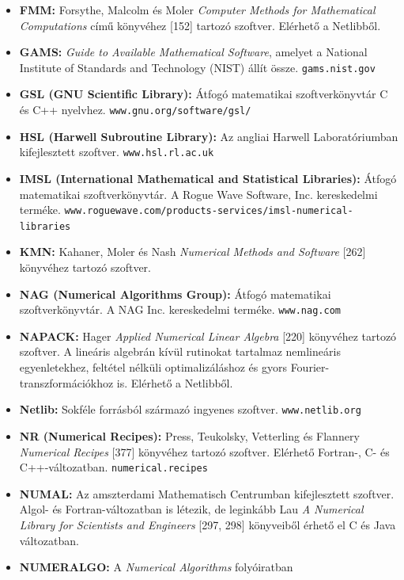 \documentclass[
  magyar,
  11pt]{article}
\providecommand{\tightlist}{%
  \setlength{\itemsep}{0pt}\setlength{\parskip}{0pt}}
\begin{document}
\begin{itemize}
\tightlist
\item
  \textbf{FMM:} Forsythe, Malcolm és Moler \emph{Computer Methods for
  Mathematical Computations} című könyvéhez {[}152{]} tartozó szoftver.
  Elérhető a Netlibből.
\item
  \textbf{GAMS:} \emph{Guide to Available Mathematical Software},
  amelyet a National Institute of Standards and Technology (NIST) állít
  össze. \texttt{gams.nist.gov}
\item
  \textbf{GSL (GNU Scientific Library):} Átfogó matematikai
  szoftverkönyvtár C és C++ nyelvhez. \texttt{www.gnu.org/software/gsl/}
\item
  \textbf{HSL (Harwell Subroutine Library):} Az angliai Harwell
  Laboratóriumban kifejlesztett szoftver. \texttt{www.hsl.rl.ac.uk}
\item
  \textbf{IMSL (International Mathematical and Statistical Libraries):}
  Átfogó matematikai szoftverkönyvtár. A Rogue Wave Software, Inc.
  kereskedelmi terméke.
  \texttt{www.roguewave.com/products-services/imsl-numerical-libraries}
\item
  \textbf{KMN:} Kahaner, Moler és Nash \emph{Numerical Methods and
  Software} {[}262{]} könyvéhez tartozó szoftver.
\item
  \textbf{NAG (Numerical Algorithms Group):} Átfogó matematikai
  szoftverkönyvtár. A NAG Inc. kereskedelmi terméke.
  \texttt{www.nag.com}
\item
  \textbf{NAPACK:} Hager \emph{Applied Numerical Linear Algebra}
  {[}220{]} könyvéhez tartozó szoftver. A lineáris algebrán kívül
  rutinokat tartalmaz nemlineáris egyenletekhez, feltétel nélküli
  optimalizáláshoz és gyors Fourier-transzformációkhoz is. Elérhető a
  Netlibből.
\item
  \textbf{Netlib:} Sokféle forrásból származó ingyenes szoftver.
  \texttt{www.netlib.org}
\item
  \textbf{NR (Numerical Recipes):} Press, Teukolsky, Vetterling és
  Flannery \emph{Numerical Recipes} {[}377{]} könyvéhez tartozó
  szoftver. Elérhető Fortran-, C- és C++-változatban.
  \texttt{numerical.recipes}
\item
  \textbf{NUMAL:} Az amszterdami Mathematisch Centrumban kifejlesztett
  szoftver. Algol- és Fortran-változatban is létezik, de leginkább Lau
  \emph{A Numerical Library for Scientists and Engineers} {[}297, 298{]}
  könyveiből érhető el C és Java változatban.
\item
  \textbf{NUMERALGO:} A \emph{Numerical Algorithms} folyóiratban

\end{itemize}
\end{document}
